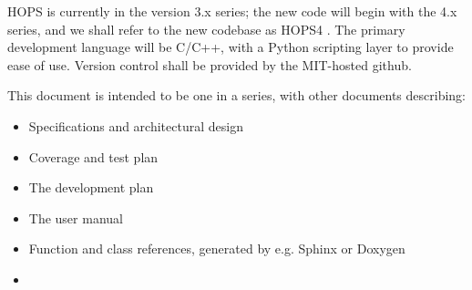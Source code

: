 \acs{HOPS} is currently in the version 3.x series; the new code will
begin with the 4.x series, and we shall refer to the new codebase as HOPS4
.
The primary development language will be C/C++, with a Python scripting layer
to provide ease of use. Version control shall be provided by the MIT-hosted
github. 









This document is intended to be one in a series, with other documents
describing:
\begin{itemize}
\item Specifications and architectural design
\item Coverage and test plan
\item The development plan
\item The user manual
\item Function and class references, generated by e.g. Sphinx or Doxygen
\item {}
\end{itemize}



%
%
